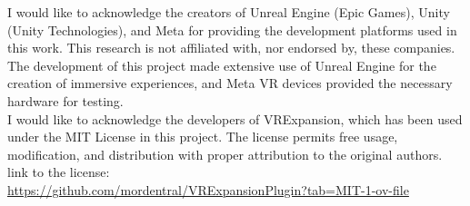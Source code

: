 
I would like to acknowledge the creators of Unreal Engine (Epic Games), Unity (Unity Technologies), and Meta for providing the development platforms used in this work. This research is not affiliated with, nor endorsed by, these companies.\\

The development of this project made extensive use of Unreal Engine for the creation of immersive experiences, and Meta VR devices provided the necessary hardware for testing.\\

I would like to acknowledge the developers of VRExpansion, which has been used under the MIT License in this project. The license permits free usage, modification, and distribution with proper attribution to the original authors.\\
link to the license:\\
\url{https://github.com/mordentral/VRExpansionPlugin?tab=MIT-1-ov-file}